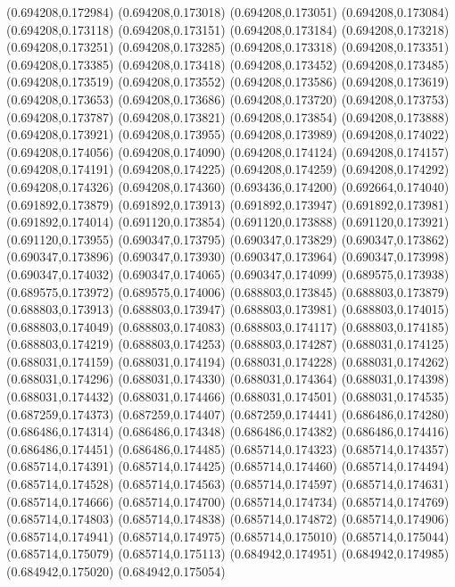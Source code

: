 (0.694208,0.172984)
(0.694208,0.173018)
(0.694208,0.173051)
(0.694208,0.173084)
(0.694208,0.173118)
(0.694208,0.173151)
(0.694208,0.173184)
(0.694208,0.173218)
(0.694208,0.173251)
(0.694208,0.173285)
(0.694208,0.173318)
(0.694208,0.173351)
(0.694208,0.173385)
(0.694208,0.173418)
(0.694208,0.173452)
(0.694208,0.173485)
(0.694208,0.173519)
(0.694208,0.173552)
(0.694208,0.173586)
(0.694208,0.173619)
(0.694208,0.173653)
(0.694208,0.173686)
(0.694208,0.173720)
(0.694208,0.173753)
(0.694208,0.173787)
(0.694208,0.173821)
(0.694208,0.173854)
(0.694208,0.173888)
(0.694208,0.173921)
(0.694208,0.173955)
(0.694208,0.173989)
(0.694208,0.174022)
(0.694208,0.174056)
(0.694208,0.174090)
(0.694208,0.174124)
(0.694208,0.174157)
(0.694208,0.174191)
(0.694208,0.174225)
(0.694208,0.174259)
(0.694208,0.174292)
(0.694208,0.174326)
(0.694208,0.174360)
(0.693436,0.174200)
(0.692664,0.174040)
(0.691892,0.173879)
(0.691892,0.173913)
(0.691892,0.173947)
(0.691892,0.173981)
(0.691892,0.174014)
(0.691120,0.173854)
(0.691120,0.173888)
(0.691120,0.173921)
(0.691120,0.173955)
(0.690347,0.173795)
(0.690347,0.173829)
(0.690347,0.173862)
(0.690347,0.173896)
(0.690347,0.173930)
(0.690347,0.173964)
(0.690347,0.173998)
(0.690347,0.174032)
(0.690347,0.174065)
(0.690347,0.174099)
(0.689575,0.173938)
(0.689575,0.173972)
(0.689575,0.174006)
(0.688803,0.173845)
(0.688803,0.173879)
(0.688803,0.173913)
(0.688803,0.173947)
(0.688803,0.173981)
(0.688803,0.174015)
(0.688803,0.174049)
(0.688803,0.174083)
(0.688803,0.174117)
(0.688803,0.174185)
(0.688803,0.174219)
(0.688803,0.174253)
(0.688803,0.174287)
(0.688031,0.174125)
(0.688031,0.174159)
(0.688031,0.174194)
(0.688031,0.174228)
(0.688031,0.174262)
(0.688031,0.174296)
(0.688031,0.174330)
(0.688031,0.174364)
(0.688031,0.174398)
(0.688031,0.174432)
(0.688031,0.174466)
(0.688031,0.174501)
(0.688031,0.174535)
(0.687259,0.174373)
(0.687259,0.174407)
(0.687259,0.174441)
(0.686486,0.174280)
(0.686486,0.174314)
(0.686486,0.174348)
(0.686486,0.174382)
(0.686486,0.174416)
(0.686486,0.174451)
(0.686486,0.174485)
(0.685714,0.174323)
(0.685714,0.174357)
(0.685714,0.174391)
(0.685714,0.174425)
(0.685714,0.174460)
(0.685714,0.174494)
(0.685714,0.174528)
(0.685714,0.174563)
(0.685714,0.174597)
(0.685714,0.174631)
(0.685714,0.174666)
(0.685714,0.174700)
(0.685714,0.174734)
(0.685714,0.174769)
(0.685714,0.174803)
(0.685714,0.174838)
(0.685714,0.174872)
(0.685714,0.174906)
(0.685714,0.174941)
(0.685714,0.174975)
(0.685714,0.175010)
(0.685714,0.175044)
(0.685714,0.175079)
(0.685714,0.175113)
(0.684942,0.174951)
(0.684942,0.174985)
(0.684942,0.175020)
(0.684942,0.175054)
